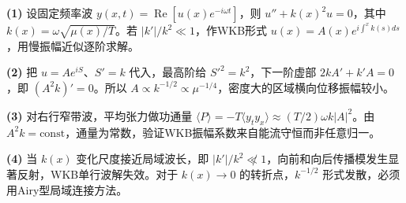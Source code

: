 \par\noindent\textbf{(1)} 设固定频率波 \(y(x,t)=\operatorname{Re}[u(x)e^{-i\omega t}]\)，则 \(u''+k(x)^2u=0\)，其中 \(k(x)=\omega\sqrt{\mu(x)/T}\)。若 \(|k'|/k^2\ll1\)，作WKB形式 \(u(x)=A(x)e^{i\int^xk(s)ds}\)，用慢振幅近似逐阶求解。
\par\noindent\textbf{(2)} 把 \(u=Ae^{iS}\)、\(S'=k\) 代入，最高阶给 \(S'^2=k^2\)，下一阶虚部 \(2kA'+k'A=0\)，即 \((A^2k)'=0\)。所以 \(A\propto k^{-1/2}\propto\mu^{-1/4}\)，密度大的区域横向位移振幅较小。
\par\noindent\textbf{(3)} 对右行窄带波，平均张力做功通量 \(\langle P\rangle=-T\langle y_ty_x\rangle\approx(T/2)\omega k|A|^2\)。由 \(A^2k=\mathrm{const}\)，通量为常数，验证WKB振幅系数来自能流守恒而非任意归一。
\par\noindent\textbf{(4)} 当 \(k(x)\) 变化尺度接近局域波长，即 \(|k'|/k^2\not\ll1\)，向前和向后传播模发生显著反射，WKB单行波解失效。对于 \(k(x)\to0\) 的转折点，\(k^{-1/2}\) 形式发散，必须用Airy型局域连接方法。
